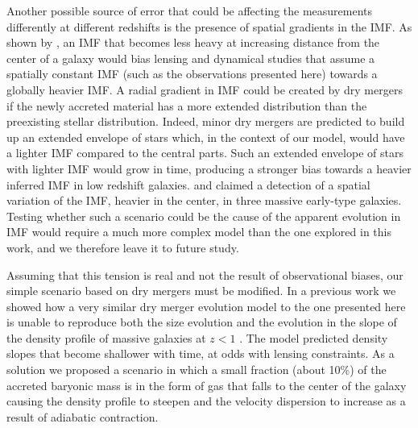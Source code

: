 \documentclass[usenatbib]{mnras}
\def\aimf{\alpha_{\mathrm{IMF}}}
\def\Fref#1{Fig.~\ref{#1}\xspace}
\begin{document}
Another possible source of error that could be affecting the
measurements differently at different redshifts is the presence of
spatial gradients in the IMF.  As shown by \citet{New++15}, an IMF
that becomes less heavy at increasing distance from the center of a
galaxy would bias lensing and dynamical studies that assume a
spatially constant IMF (such as the observations presented here)
towards a globally heavier IMF. A radial gradient in IMF could be
created by dry mergers if the newly accreted material has a more
extended distribution than the preexisting stellar
distribution. Indeed, minor dry mergers are predicted to build up an
extended envelope of stars \citep{NJO09,Hop++10} which, in the context
of our model, would have a lighter IMF compared to the central
parts. Such an extended envelope of stars with lighter IMF would grow
in time, producing a stronger bias towards a heavier inferred IMF in
low redshift galaxies. \citet{Mar++15} and \citet{LaB++16} claimed a
detection of a spatial variation of the IMF, heavier in the center, in
three massive early-type galaxies.  Testing whether such a scenario
could be the cause of the apparent evolution in IMF would require a
much more complex model than the one explored in this work, and we
therefore leave it to future study.


Assuming that this tension is real and not the result of observational
biases, our simple scenario based on dry mergers must be modified.  In
a previous work we showed how a very similar dry merger evolution
model to the one presented here is unable to reproduce both the size
evolution and the evolution in the slope of the density profile of
massive galaxies at $z<1$ \citep{SNT14}.  The model predicted density
slopes that become shallower with time, at odds with lensing
constraints. As a solution we proposed a scenario in which a small
fraction (about 10\%) of the accreted baryonic mass is in the form of
gas that falls to the center of the galaxy causing the density profile
to steepen and the velocity dispersion to increase as a result of
adiabatic contraction.  
\end{document}

